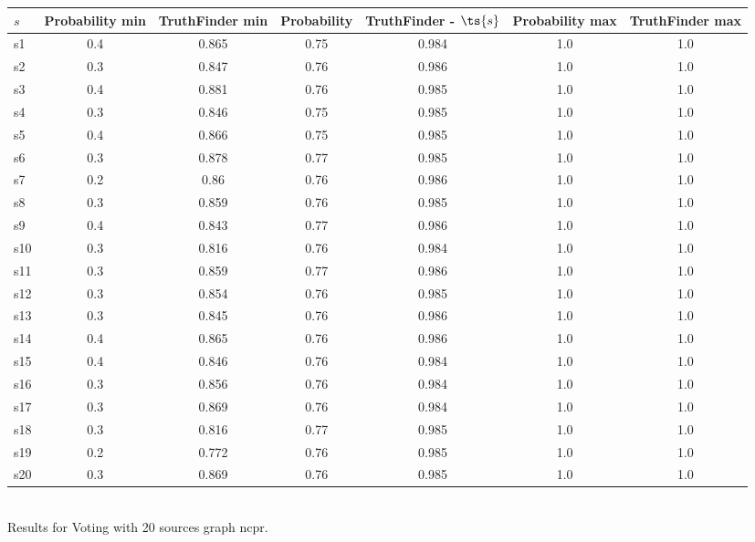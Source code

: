 \documentclass{article}
\begin{document}
\noindent\begin{tabular}{|l|c|c|c|c|c|c|}
\hline
$s$& Probability min & TruthFinder min & Probability & TruthFinder - $\ts{s}$ & Probability max & TruthFinder max\\
\hline
s1 &0.4 & 0.865 & 0.75 & 0.984 & 1.0 & 1.0\\
\hline
s2 &0.3 & 0.847 & 0.76 & 0.986 & 1.0 & 1.0\\
\hline
s3 &0.4 & 0.881 & 0.76 & 0.985 & 1.0 & 1.0\\
\hline
s4 &0.3 & 0.846 & 0.75 & 0.985 & 1.0 & 1.0\\
\hline
s5 &0.4 & 0.866 & 0.75 & 0.985 & 1.0 & 1.0\\
\hline
s6 &0.3 & 0.878 & 0.77 & 0.985 & 1.0 & 1.0\\
\hline
s7 &0.2 & 0.86 & 0.76 & 0.986 & 1.0 & 1.0\\
\hline
s8 &0.3 & 0.859 & 0.76 & 0.985 & 1.0 & 1.0\\
\hline
s9 &0.4 & 0.843 & 0.77 & 0.986 & 1.0 & 1.0\\
\hline
s10 &0.3 & 0.816 & 0.76 & 0.984 & 1.0 & 1.0\\
\hline
s11 &0.3 & 0.859 & 0.77 & 0.986 & 1.0 & 1.0\\
\hline
s12 &0.3 & 0.854 & 0.76 & 0.985 & 1.0 & 1.0\\
\hline
s13 &0.3 & 0.845 & 0.76 & 0.986 & 1.0 & 1.0\\
\hline
s14 &0.4 & 0.865 & 0.76 & 0.986 & 1.0 & 1.0\\
\hline
s15 &0.4 & 0.846 & 0.76 & 0.984 & 1.0 & 1.0\\
\hline
s16 &0.3 & 0.856 & 0.76 & 0.984 & 1.0 & 1.0\\
\hline
s17 &0.3 & 0.869 & 0.76 & 0.984 & 1.0 & 1.0\\
\hline
s18 &0.3 & 0.816 & 0.77 & 0.985 & 1.0 & 1.0\\
\hline
s19 &0.2 & 0.772 & 0.76 & 0.985 & 1.0 & 1.0\\
\hline
s20 &0.3 & 0.869 & 0.76 & 0.985 & 1.0 & 1.0\\
\hline
\end{tabular}\\

\noindent Results for Voting with 20 sources graph ncpr.
\end{document}
